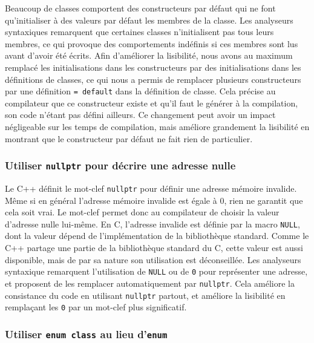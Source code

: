 Beaucoup de classes comportent des constructeurs par défaut qui ne font
qu'initialiser à des valeurs par défaut les membres de la classe. Les
analyseurs syntaxiques remarquent que certaines classes n'initialisent
pas tous leurs membres, ce qui provoque des comportements indéfinis si
ces membres sont lus avant d'avoir été écrits. Afin d'améliorer la
lisibilité, nous avons au maximum remplacé les initialisations dans les
constructeurs par des initialisations dans les définitions de classes,
ce qui nous a permis de remplacer plusieurs constructeurs par une
définition \texttt{=\ default} dans la définition de classe. Cela
précise au compilateur que ce constructeur existe et qu'il faut le
générer à la compilation, son code n'étant pas défini ailleurs. Ce
changement peut avoir un impact négligeable sur les temps de
compilation, mais améliore grandement la lisibilité en montrant que le
constructeur par défaut ne fait rien de particulier.

\subsubsection{\texorpdfstring{Utiliser \texttt{nullptr} pour décrire
une adresse nulle}{Utiliser nullptr pour décrire une adresse nulle}}

Le C++ définit le mot-clef \texttt{nullptr} pour définir une adresse
mémoire invalide. Même si en général l'adresse mémoire invalide est
égale à 0, rien ne garantit que cela soit vrai. Le mot-clef permet donc
au compilateur de choisir la valeur d'adresse nulle lui-même. En C,
l'adresse invalide est définie par la macro \texttt{NULL}, dont la
valeur dépend de l'implémentation de la bibliothèque standard. Comme le
C++ partage une partie de la bibliothèque standard du C, cette valeur
est aussi disponible, mais de par sa nature son utilisation est
déconseillée. Les analyseurs syntaxique remarquent l'utilisation de
\texttt{NULL} ou de \texttt{0} pour représenter une adresse, et
proposent de les remplacer automatiquement par \texttt{nullptr}. Cela
améliore la consistance du code en utilisant \texttt{nullptr} partout,
et améliore la lisibilité en remplaçant les \texttt{0} par un mot-clef
plus significatif.

\subsubsection{\texorpdfstring{Utiliser \texttt{enum\ class} au lieu
d'\texttt{enum}}{Utiliser enum class au lieu d'enum}}

